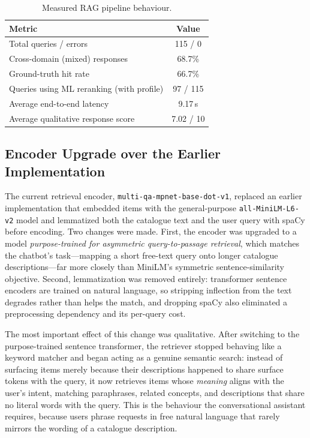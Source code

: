 \begin{table}[H]
    \centering
    \caption{Measured RAG pipeline behaviour.}
    \label{tab:rag_eval}
    \begin{tabular}{|l|c|}
        \hline
        \textbf{Metric} & \textbf{Value} \\ \hline
        Total queries / errors & 115 / 0 \\ \hline
        Cross-domain (mixed) responses & 68.7\% \\ \hline
        Ground-truth hit rate & 66.7\% \\ \hline
        Queries using ML reranking (with profile) & 97 / 115 \\ \hline
        Average end-to-end latency & 9.17\,s \\ \hline
        Average qualitative response score & 7.02 / 10 \\ \hline
    \end{tabular}
\end{table}


\subsection{Encoder Upgrade over the Earlier Implementation}
\label{sec:rag_encoder_comparison}
The current retrieval encoder, \texttt{multi-qa-mpnet-base-dot-v1}, replaced an earlier implementation that embedded items with the general-purpose \texttt{all-MiniLM-L6-v2} model and lemmatized both the catalogue text and the user query with spaCy before encoding. Two changes were made. First, the encoder was upgraded to a model \emph{purpose-trained for asymmetric query-to-passage retrieval}, which matches the chatbot's task---mapping a short free-text query onto longer catalogue descriptions---far more closely than MiniLM's symmetric sentence-similarity objective. Second, lemmatization was removed entirely: transformer sentence encoders are trained on natural language, so stripping inflection from the text degrades rather than helps the match, and dropping spaCy also eliminated a preprocessing dependency and its per-query cost.

The most important effect of this change was qualitative. After switching to the purpose-trained sentence transformer, the retriever stopped behaving like a keyword matcher and began acting as a genuine semantic search: instead of surfacing items merely because their descriptions happened to share surface tokens with the query, it now retrieves items whose \emph{meaning} aligns with the user's intent, matching paraphrases, related concepts, and descriptions that share no literal words with the query. This is the behaviour the conversational assistant requires, because users phrase requests in free natural language that rarely mirrors the wording of a catalogue description.

